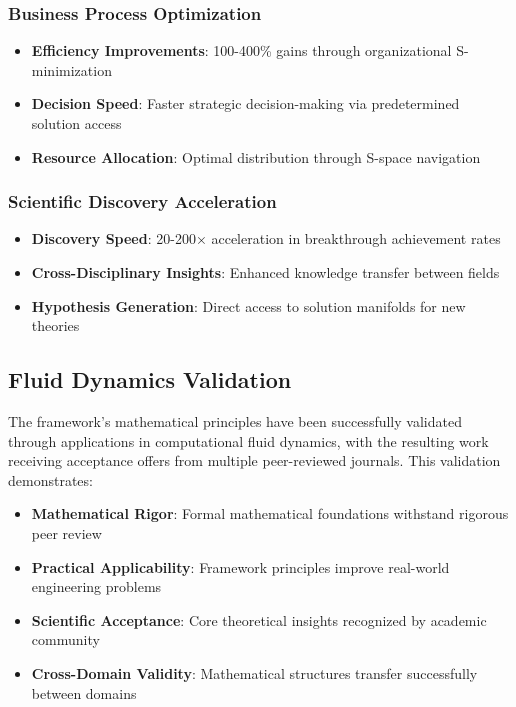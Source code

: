 \documentclass[11pt]{article}
\theoremstyle{definition}
\theoremstyle{remark}
\begin{document}
\subsubsection{Business Process Optimization}
\begin{itemize}
\item \textbf{Efficiency Improvements}: 100-400\% gains through organizational S-minimization
\item \textbf{Decision Speed}: Faster strategic decision-making via predetermined solution access
\item \textbf{Resource Allocation}: Optimal distribution through S-space navigation
\end{itemize}

\subsubsection{Scientific Discovery Acceleration}
\begin{itemize}
\item \textbf{Discovery Speed}: 20-200× acceleration in breakthrough achievement rates
\item \textbf{Cross-Disciplinary Insights}: Enhanced knowledge transfer between fields
\item \textbf{Hypothesis Generation}: Direct access to solution manifolds for new theories
\end{itemize}

\subsection{Fluid Dynamics Validation}

The framework's mathematical principles have been successfully validated through applications in computational fluid dynamics, with the resulting work receiving acceptance offers from multiple peer-reviewed journals. This validation demonstrates:

\begin{itemize}
\item \textbf{Mathematical Rigor}: Formal mathematical foundations withstand rigorous peer review
\item \textbf{Practical Applicability}: Framework principles improve real-world engineering problems
\item \textbf{Scientific Acceptance}: Core theoretical insights recognized by academic community
\item \textbf{Cross-Domain Validity}: Mathematical structures transfer successfully between domains
\end{itemize}
\end{document}
